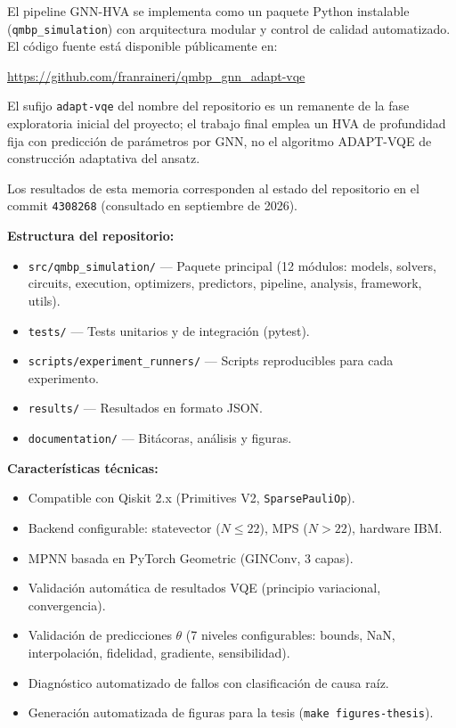 \documentclass[11pt,a4paper,spanish]{book}
\begin{document}
El pipeline GNN-HVA se implementa como un paquete Python instalable (\texttt{qmbp\_simulation}) con arquitectura modular y control de calidad automatizado. El código fuente está disponible públicamente en:

\begin{center}
\url{https://github.com/franraineri/qmbp_gnn_adapt-vqe}
\end{center}

El sufijo \texttt{adapt-vqe} del nombre del repositorio es un remanente de la fase exploratoria inicial del proyecto; el trabajo final emplea un HVA de profundidad fija con predicción de parámetros por GNN, no el algoritmo ADAPT-VQE de construcción adaptativa del ansatz.

Los resultados de esta memoria corresponden al estado del repositorio en el commit \texttt{4308268} (consultado en septiembre de 2026).

\textbf{Estructura del repositorio:}
\begin{itemize}
    \item \texttt{src/qmbp\_simulation/} --- Paquete principal (12 módulos: models, solvers, circuits, execution, optimizers, predictors, pipeline, analysis, framework, utils).
    \item \texttt{tests/} --- Tests unitarios y de integración (pytest).
    \item \texttt{scripts/experiment\_runners/} --- Scripts reproducibles para cada experimento.
    \item \texttt{results/} --- Resultados en formato JSON.
    \item \texttt{documentation/} --- Bitácoras, análisis y figuras.
\end{itemize}

\textbf{Características técnicas:}
\begin{itemize}
    \item Compatible con Qiskit 2.x (Primitives V2, \texttt{SparsePauliOp}).
    \item Backend configurable: statevector ($N \leq 22$), MPS ($N > 22$), hardware IBM.
    \item MPNN basada en PyTorch Geometric \citep{fey2019} (GINConv, 3 capas).
    \item Validación automática de resultados VQE (principio variacional, convergencia).
    \item Validación de predicciones $\theta$ (7 niveles configurables: bounds, NaN, interpolación, fidelidad, gradiente, sensibilidad).
    \item Diagnóstico automatizado de fallos con clasificación de causa raíz.
    \item Generación automatizada de figuras para la tesis (\texttt{make figures-thesis}).
\end{itemize}
\end{document}
